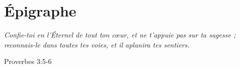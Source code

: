 \thispagestyle{empty}

\chapter*{Épigraphe}

\vspace{2cm}

\begin{flushright}
    \begin{minipage}{0.72\linewidth}
        \textit{Confie-toi en l'Éternel de tout ton cœur,
        et ne t'appuie pas sur ta sagesse ; reconnais-le
        dans toutes tes voies, et il aplanira tes sentiers.}

        \vspace{0.4cm}

        \hfill Proverbes 3:5-6
    \end{minipage}
\end{flushright}

\vspace{2.5cm}
\vfill
